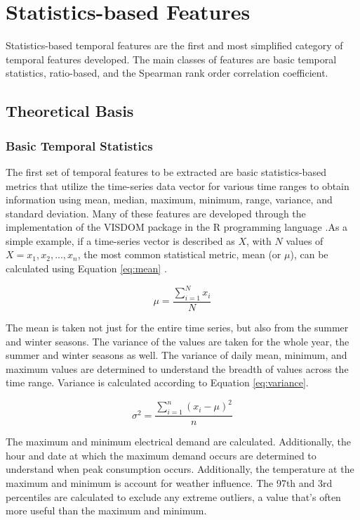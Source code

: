 \chapter{Statistics-based Features}
\label{sec:statisticsfeatures}

Statistics-based temporal features are the first and most simplified category of temporal features developed. The main classes of features are basic temporal statistics, ratio-based, and the Spearman rank order correlation coefficient.

\section{Theoretical Basis}
\subsection{Basic Temporal Statistics}
\label{sec:basicstatistics}

The first set of temporal features to be extracted are basic statistics-based metrics that utilize the time-series data vector for various time ranges to obtain information using mean, median, maximum, minimum, range, variance, and standard deviation. Many of these features are developed through the implementation of the VISDOM package in the R programming language \citep{visdom_borgeson}.As a simple example, if a time-series vector is described as $X$, with $N$ values of $X = {x_1, x_2,...,x_n}$, the most common statistical metric, mean (or $\mu$), can be calculated using Equation \ref{eq:mean} \citep{Mitsa_2010}.

\begin{equation}
\mu = \frac{\sum\limits_{i=1}^N x_i}{N}
\label{eq:mean}
\end{equation}

The mean is taken not just for the entire time series, but also from the summer and winter seasons. The variance of the values are taken for the whole year, the summer and winter seasons as well. The variance of daily mean, minimum, and maximum values are determined to understand the breadth of values across the time range. Variance is calculated according to Equation \ref{eq:variance}. 


\begin{equation}
\sigma^2 = \frac{\displaystyle\sum_{i=1}^{n}(x_i - \mu)^2} {n}
\label{eq:variance}
\end{equation}

The maximum and minimum electrical demand are calculated. Additionally, the hour and date at which the maximum demand occurs are determined to understand when peak consumption occurs. Additionally, the temperature at the maximum and minimum is account for weather influence. The 97th and 3rd percentiles are calculated to exclude any extreme outliers, a value that's often more useful than the maximum and minimum.\\ 

